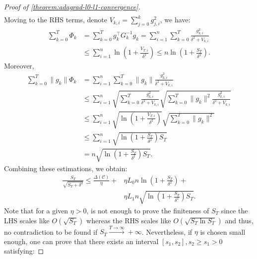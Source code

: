 \documentclass{article}
\theoremstyle{plain}
\theoremstyle{definition}
\theoremstyle{remark}
\begin{document}
\begin{proof}[Proof of \cref{theorem:adagrad-l0-l1-convergence}]
\begin{equation*}
\begin{aligned}
        \end{aligned}
    \end{equation*}
    Moving to the RHS terms, denote $V_{k,i} = \sum_{j = 0}^k g_{j,i}^2$, we have:
    \begin{equation*}
        \begin{aligned}
            \sum_{k = 0}^T \Phi_k &= \sum_{k = 0}^T g_k^\top G_k^{-1} g_k = \sum_{i = 1}^n \sum_{k = 0}^T \frac{g_{k,i}^2}{{\delta^2 + V_{k,i}}}\\
            &\leq \sum_{i = 1}^n \ln\left(1 + \frac{V_{T,i}}{\delta^2}\right) \leq n\ln \left(1 + \frac{S_T}{\delta^2}\right).
        \end{aligned}
    \end{equation*}
    Moreover,
    \begin{equation*}
        \begin{aligned}
            \sum_{k=0}^T \|g_k\|\Phi_k &= \sum_{i = 1}^n \sum_{k = 0}^T \|g_k\| \frac{g_{k,i}^2}{\delta^2 + V_{k,i}} \\
            &\leq \sum_{i = 1}^n \sqrt{\sum_{k = 0}^T \frac{g_{k,i}^2}{\delta^2 + V_{k,i}}} \sqrt{\sum_{k = 0}^T \|g_k\|^2\frac{g_{k,i}^2}{\delta^2 + V_{k,i}}}\\
            &\leq \sum_{i = 1}^n \sqrt{\ln\left(1 + \frac{V_{T,i}}{\delta^2}\right)}\sqrt{\sum_{k=0}^T \|g_k\|^2}\\
            &\leq \sum_{i = 1}^n \sqrt{\ln\left(1 + \frac{S_{T}}{\delta^2}\right)S_T}\\
            &= n \sqrt{\ln\left(1 + \frac{S_T}{\delta^2}\right)S_T}.
        \end{aligned}
    \end{equation*}
    Combining these estimations, we obtain:
    \begin{equation}
        \label{eq:key-inequality}
        \begin{aligned}
            \frac{S_T}{\sqrt{S_T + \delta^2}} \leq \frac{\Delta(\mathcal{C})}{\eta} + &\eta L_0 n \ln\left(1 + \frac{S_T}{\delta^2}\right) + \\
            &\eta L_1 n \sqrt{\ln\left(1 + \frac{S_T}{\delta^2}\right)S_T}.
        \end{aligned}
    \end{equation}
    Note that for a given $\eta > 0$,  is not enough to prove the finiteness of $S_T$ since the LHS scales like $O(\sqrt{S_T})$ whereas the RHS scales like $O(\sqrt{S_T\ln{S_T}})$ and thus, no contradiction to be found if $S_T \overset{T \to \infty}{\to} +\infty$. Nevertheless, if $\eta$ is chosen small enough, one can prove that there exists an interval $[s_1, s_2], s_2 \geq s_1 > 0$ satisfying:

\end{proof}
\end{document}
